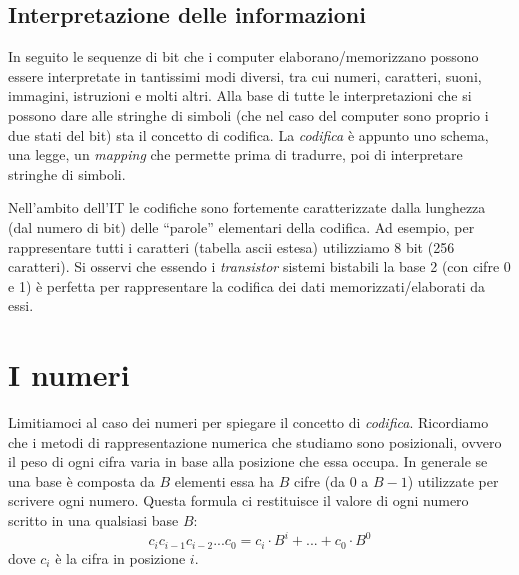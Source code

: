 \documentclass[class=book, crop=false, oneside]{standalone}
\begin{document}
\subsection{Interpretazione delle informazioni} In seguito le sequenze di bit che i computer elaborano/memorizzano possono essere interpretate in tantissimi modi diversi, tra cui numeri, caratteri, suoni, immagini, istruzioni e molti altri. Alla base di tutte le interpretazioni che si possono dare alle stringhe di simboli (che nel caso del computer sono proprio i due stati del bit) sta il concetto di codifica. La \emph{codifica} è appunto uno schema, una legge, un \emph{mapping} che permette prima di tradurre, poi di interpretare stringhe di simboli.

Nell’ambito dell’IT le codifiche sono fortemente caratterizzate dalla lunghezza (dal numero di bit) delle “parole” elementari della codifica. Ad esempio, per rappresentare tutti i caratteri (tabella \acrshort{ascii} estesa) utilizziamo  8 bit (256 caratteri). Si osservi che essendo i \emph{transistor} sistemi bistabili la base 2 (con cifre 0 e 1) è perfetta per rappresentare la codifica dei dati memorizzati/elaborati da essi.

\section{I numeri}
Limitiamoci al caso dei numeri per spiegare il concetto di \emph{codifica}. Ricordiamo che i metodi di rappresentazione numerica che studiamo sono posizionali, ovvero il peso di ogni cifra varia in base alla posizione che essa occupa. In generale se una base è composta da \(B\) elementi essa ha \(B\) cifre (da 0 a \(B-1\)) utilizzate per scrivere ogni numero. Questa formula ci restituisce il valore di ogni numero scritto in una qualsiasi base \(B\):
\begin{equation*}
	c_{i} c_{i-1} c_{i-2}... c_{0}=c_{i}\cdot B^{i}+...+c_{0}\cdot B^{0}
\end{equation*}
dove \(c_{i}\) è la cifra in posizione \(i\).
\end{document}
